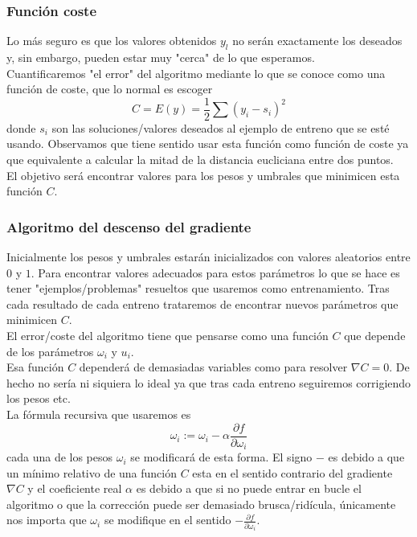 \documentclass{article}
\begin{document}
\subsubsection{Función coste}
Lo más seguro es que los valores obtenidos $y_l$ no serán exactamente los deseados y, sin embargo, pueden estar muy "cerca" de lo que esperamos.\\
Cuantificaremos "el error" del algoritmo mediante lo que se conoce como una función de coste, que lo normal es escoger
$$C=E(y)=\frac1{2}\sum (y_i-s_i)^2 $$
donde $s_i$ son las soluciones/valores deseados al ejemplo de entreno que se esté usando.
Observamos que tiene sentido usar esta función como función de coste ya que equivalente a calcular la mitad de la distancia eucliciana entre dos puntos.\\
El objetivo será encontrar valores para los pesos y umbrales que minimicen esta función $C$.\\
\subsubsection{Algoritmo del descenso del gradiente}
Inicialmente los pesos y umbrales estarán inicializados con valores aleatorios entre $0$ y $1$. Para encontrar valores adecuados para estos parámetros lo que se hace es tener "ejemplos/problemas" resueltos que usaremos como entrenamiento. Tras cada resultado de cada entreno trataremos de encontrar nuevos parámetros que minimicen $C$.\\

El error/coste del algoritmo tiene que pensarse como una función $C$ que depende de los parámetros $\omega_i$ y $u_i$.\\
Esa función $C$ dependerá de demasiadas variables como para resolver $\nabla C=0 $. De hecho no sería ni siquiera lo ideal ya que tras cada entreno seguiremos corrigiendo los pesos etc.\\

La fórmula recursiva que usaremos es 
$$\omega_{i}:=\omega_i-\alpha\frac{\partial f}{\partial \omega_i} $$
cada una de los pesos $\omega_i $ se modificará de esta forma. El signo $-$ es debido a que un mínimo relativo de una función $C$ esta en el sentido contrario del gradiente $\nabla C$ y el coeficiente real $\alpha $ es debido a que si no puede entrar en bucle el algoritmo o que la corrección puede ser demasiado brusca/ridícula, únicamente nos importa que $\omega_i$ se modifique en el sentido $-\frac{\partial f}{\partial \omega_i} $.\\
\end{document}
